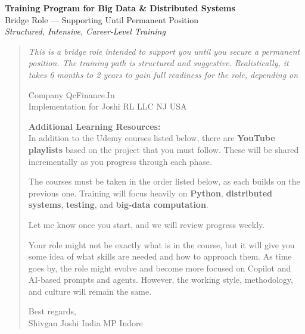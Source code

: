 \documentclass[12pt]{article}
\begin{document}
	
	\begin{center}
		{\Huge\bfseries Training Program for Big Data \& Distributed Systems} \\[0.5cm]
		{\large Bridge Role — Supporting Until Permanent Position} \\[0.3cm]
		{\textit{Structured, Intensive, Career-Level Training}} \\[1cm]
	\end{center}
	
	\begin{quote}
		\emph{This is a bridge role intended to support you until you secure a permanent position. The training path is structured and suggestive. Realistically, it takes 6 months to 2 years to gain full readiness for the role, depending on}
		
		\vspace{0.3cm}
		

		Company QcFinance.In \\
		Implementation for Joshi RL LLC NJ USA
		
		\vspace{0.3cm}
		
		\textbf{Additional Learning Resources:} \\
		In addition to the Udemy courses listed below, there are \textbf{YouTube playlists} based on the project that you must follow. These will be shared incrementally as you progress through each phase.
		
		\vspace{0.3cm}
		
		The courses must be taken in the order listed below, as each builds on the previous one. Training will focus heavily on \textbf{Python}, \textbf{distributed systems}, \textbf{testing}, and \textbf{big-data computation}.
		
		Let me know once you start, and we will review progress weekly.
		
		Your role might not be exactly what is in the course, but it will give you some idea of what skills are needed and how to approach them. As time goes by, the role might evolve and become more focused on Copilot and AI-based prompts and agents. However, the working style, methodology, and culture will remain the same.
		
		Best regards, \\
		Shivgan Joshi India MP Indore
	\end{quote}
	
	\newpage
	
\end{document}
